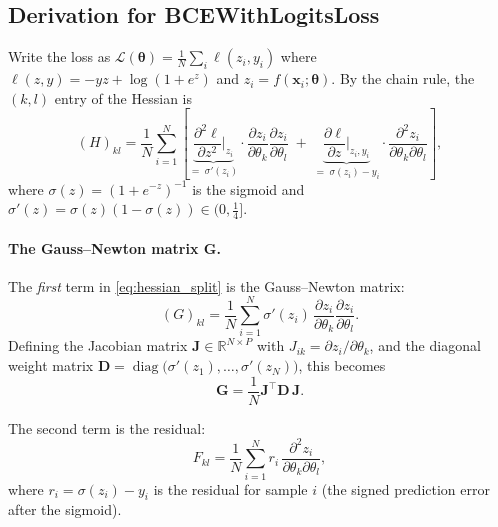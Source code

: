 \documentclass[12pt,a4paper]{article}
\newcommand{\R}{\mathbb{R}}
\newcommand{\diag}{\operatorname{diag}}
\newcommand{\btheta}{\boldsymbol{\theta}}
\newcommand{\bx}{\mathbf{x}}
\newcommand{\bJ}{\mathbf{J}}
\newcommand{\bG}{\mathbf{G}}
\newcommand{\sigmoid}{\sigma}
\begin{document}
\subsection{Derivation for BCEWithLogitsLoss}
\label{ssec:gn_derivation}

Write the loss as $\mathcal{L}(\btheta) = \frac{1}{N}\sum_i \ell(z_i, y_i)$
where $\ell(z,y) = -yz + \log(1+e^z)$ and $z_i = f(\bx_i;\btheta)$.
By the chain rule, the $(k,l)$ entry of the Hessian is
\begin{equation}
  (H)_{kl}
  = \frac{1}{N}\sum_{i=1}^N \left[
      \underbrace{\frac{\partial^2 \ell}{\partial z^2}\bigg|_{z_i}}_{=\;\sigmoid'(z_i)}
      \cdot
      \frac{\partial z_i}{\partial \theta_k}
      \frac{\partial z_i}{\partial \theta_l}
      \;+\;
      \underbrace{\frac{\partial \ell}{\partial z}\bigg|_{z_i,y_i}}_{=\;\sigmoid(z_i)-y_i}
      \cdot
      \frac{\partial^2 z_i}{\partial \theta_k \partial \theta_l}
    \right],
  \label{eq:hessian_split}
\end{equation}
where $\sigmoid(z) = (1+e^{-z})^{-1}$ is the sigmoid and
$\sigmoid'(z) = \sigmoid(z)(1-\sigmoid(z)) \in (0,\tfrac{1}{4}]$.

\paragraph{The Gauss--Newton matrix $\bG$.}
The \emph{first} term in \eqref{eq:hessian_split} is the Gauss--Newton
matrix:
\begin{equation}
  \boxed{
    (G)_{kl}
    = \frac{1}{N}\sum_{i=1}^N
      \sigmoid'(z_i)\,
      \frac{\partial z_i}{\partial \theta_k}
      \frac{\partial z_i}{\partial \theta_l}.
  }
  \label{eq:G_elementwise}
\end{equation}
Defining the Jacobian matrix $\bJ \in \R^{N \times P}$ with
$J_{ik} = \partial z_i / \partial \theta_k$, and the diagonal weight matrix
$\mathbf{D} = \diag\!\bigl(\sigmoid'(z_1), \ldots, \sigmoid'(z_N)\bigr)$, this
becomes
\begin{equation}
  \bG = \frac{1}{N}\bJ^\top \mathbf{D}\, \bJ.
  \label{eq:G_matrix}
\end{equation}

The second term is the residual:
\begin{equation}
  F_{kl}
  = \frac{1}{N}\sum_{i=1}^N
    r_i\,
    \frac{\partial^2 z_i}{\partial \theta_k \partial \theta_l},
  \label{eq:F_elementwise}
\end{equation}
where $r_i = \sigmoid(z_i) - y_i$ is the residual for sample $i$
(the signed prediction error after the sigmoid).
\end{document}
